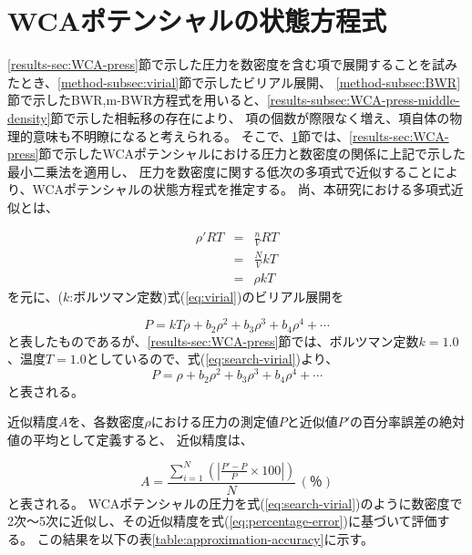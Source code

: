 \documentclass[titlepage]{jsreport}
\begin{document}
{{{\section{WCAポテンシャルの状態方程式}\label{results-sec:WCA-equation}
\ref{results-sec:WCA-press}節で示した圧力を数密度を含む項で展開することを試みたとき、\ref{method-subsec:virial}節で示したビリアル展開、
\ref{method-subsec:BWR}節で示したBWR,m-BWR方程式を用いると、\ref{results-subsec:WCA-press-middle-density}節で示した相転移の存在により、
項の個数が際限なく増え、項自体の物理的意味も不明瞭になると考えられる。
そこで、\ref{results-sec:WCA-equation}節では、\ref{results-sec:WCA-press}節で示したWCAポテンシャルにおける圧力と数密度の関係に上記で示した最小二乗法を適用し、
圧力を数密度に関する低次の多項式で近似することにより、WCAポテンシャルの状態方程式を推定する。
尚、本研究における多項式近似とは、

\large
\begin{eqnarray}
    {{\rho}'}RT \nonumber &=& \frac{n}{V}RT \nonumber \\ 
    &=& \frac{N}{V}kT \nonumber \\ 
    &=& {\rho}kT \nonumber
\end{eqnarray}
\normalsize
を元に、($k$:ボルツマン定数)式(\ref{eq:virial})のビリアル展開を

\large
\begin{equation}
    P=kT\rho+b_2\rho^2+b_3\rho^3+b_4\rho^4+\cdots\label{eq:search-virial}
\end{equation}
\normalsize
と表したものであるが、\ref{results-sec:WCA-press}節では、ボルツマン定数$k=1.0$、温度$T=1.0$としているので、式(\ref{eq:search-virial})より、
\large
\begin{equation}
    P=\rho+b_2\rho^2+b_3\rho^3+b_4\rho^4+\cdots\label{eq:modified-search-virial}
\end{equation}
\normalsize
と表される。

近似精度$A$を、各数密度$\rho$における圧力の測定値$P$と近似値$P'$の百分率誤差の絶対値の平均として定義すると、
近似精度は、

\large
\begin{equation}
    A=\frac{\sum_{i=1}^N\left(|\frac{P'-P}{P}\times100|\right)}{N}\,(％)\label{eq:percentage-error}
\end{equation}
\normalsize
と表される。
WCAポテンシャルの圧力を式(\ref{eq:search-virial})のように数密度で2次〜5次に近似し、その近似精度を式(\ref{eq:percentage-error})に基づいて評価する。
この結果を以下の表\ref{table:approximation-accuracy}に示す。

}}}
\end{document}

